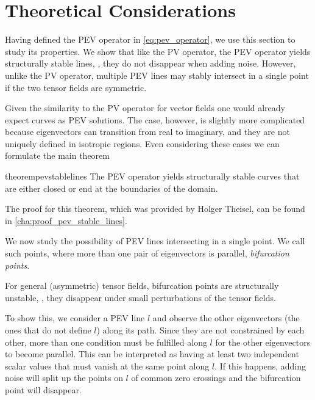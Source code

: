 \section{Theoretical Considerations} %
\label{sec:pev_theory}
%
Having defined the \ac{PEV} operator in \cref{eq:pev_operator}, we use this
section to study its properties.
%
We show that like the \ac{PV} operator, the \ac{PEV} operator yields
structurally stable lines, \ie{}, they do not disappear when adding noise.
%
However, unlike the \ac{PV} operator, multiple \ac{PEV} lines may stably
intersect in a single point if the two tensor fields are symmetric.
% 

%
Given the similarity to the \ac{PV} operator for vector fields one would
already expect curves as \ac{PEV} solutions.
%
The case, however, is slightly more complicated because eigenvectors can
transition from real to imaginary, and they are not uniquely defined in
isotropic regions.
%
Even considering these cases we can formulate the main theorem
%
\begin{restatable}{theorem}{pevstablelines}
    \label{thm:pev_stable_lines}%
    The \ac{PEV} operator yields structurally stable curves that are either
    closed or end at the boundaries of the domain.
\end{restatable}
%
The proof for this theorem, which was provided by Holger Theisel, can be found
in \cref{cha:proof_pev_stable_lines}.
%

%
We now study the possibility of \ac{PEV} lines intersecting in a single point.
%
We call such points, where more than one pair of eigenvectors is parallel,
\emph{bifurcation points}.
%
\begin{theorem}\label{pev_bifurcation_unstable}
    For general (asymmetric) tensor fields, bifurcation points are structurally
    unstable, \ie{}, they disappear under small perturbations of the tensor
    fields.
\end{theorem}
%
To show this, we consider a \ac{PEV} line $l$ and observe the other eigenvectors
(the ones that do not define $l$) along its path.
%
Since they are not constrained by each other, more than one condition must be
fulfilled along $l$ for the other eigenvectors to become parallel.
%
This can be interpreted as having at least two independent scalar values that
must vanish at the same point along $l$.
%
If this happens, adding noise will split up the points on $l$ of common zero
crossings and the bifurcation point will disappear.
%

